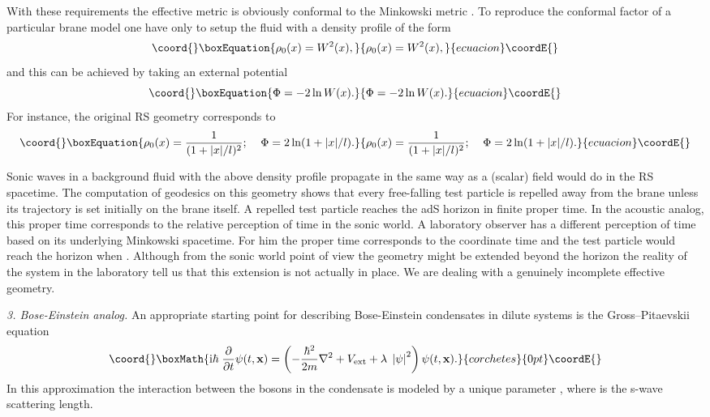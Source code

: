 \documentclass[a4paper,prl,showpacs,twocolumn]{revtex4}
\begin{document}
With these requirements the effective metric is obviously  
conformal to the Minkowski metric \coordHE{}.
To reproduce the conformal factor of a particular brane model one have only
to setup the fluid with a density profile of the form
%
\begin{equation}\coord{}\boxEquation{  
\rho_0(x)=W^2(x),
\label{density-profile}
}{  
\rho_0(x)=W^2(x),
}{ecuacion}\coordE{}\end{equation}
%
and this can be achieved by taking an external potential 
%
\begin{equation}\coord{}\boxEquation{ 
\Phi=-2\ln W(x).
\label{external-potential}
}{ 
\Phi=-2\ln W(x).
}{ecuacion}\coordE{}\end{equation}
%
For instance, the original RS geometry corresponds to
%
\begin{equation}\coord{}\boxEquation{  
\rho_0(x)={1 \over (1+|x|/l)^2}; \;\;\;\; \Phi=2\ln(1+|x|/l).
}{  
\rho_0(x)={1 \over (1+|x|/l)^2}; \;\;\;\; \Phi=2\ln(1+|x|/l).
}{ecuacion}\coordE{}\end{equation}
%



Sonic waves in a background fluid with the above density profile
propagate in the same way as a (scalar) field would do in the RS
spacetime. 
The computation of geodesics on this geometry 
\cite{MucVisVol:2000}
shows that every free-falling test particle is repelled away from the
brane unless its trajectory is set initially on the brane itself.  A
repelled test particle reaches the adS horizon in finite
proper time. In the acoustic analog, this proper time corresponds
to the relative perception of time in the sonic world. 
A laboratory observer has a different perception of time based on
its underlying Minkowski spacetime. For him the proper time corresponds
to the coordinate time \coordHE{} and the test particle would reach
the horizon when \coordHE{}. Although from the 
sonic world point of view the geometry might be extended beyond
the horizon the reality of the system in the laboratory tell us 
that this extension is not actually in place. We are dealing with 
a genuinely incomplete effective geometry. 






\noindent
{\it 3. Bose-Einstein analog.}
An appropriate starting point for describing Bose-Einstein condensates 
in dilute systems is the Gross--Pitaevskii equation 
\cite{dalfovo}
%
\[\coord{}\boxMath{
\label{E:tdlg}
 \im \hbar \; \frac{\partial }{\partial t} \psi(t,\x)= \left (
 - {\hbar^2\over2m}\nabla^2 
 + V_{\rm ext}
 + \lambda \; \left| \psi \right|^2 \right) \psi(t,\x).}{corchetes}{0pt}\coordE{}
\label{eq:GP}
\]
%
In this approximation the interaction between the bosons in the 
condensate is modeled by a unique parameter 
\coordHE{}, where \coordHE{} is the s-wave scattering length.
\end{document}
